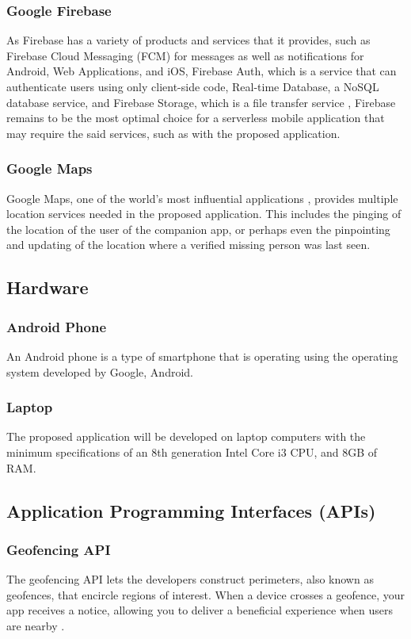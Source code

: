 \subsubsection{Google Firebase}
As Firebase has a variety of products and services that it provides, such as Firebase Cloud Messaging (FCM) for messages as well as notifications for Android, Web Applications, and iOS, Firebase Auth, which is a service that can authenticate users using only client-side code, Real-time Database, a NoSQL database service, and Firebase Storage, which is a file transfer service \cite{khawas2018application}, Firebase remains to be the most optimal choice for a serverless mobile application that may require the said services, such as with the proposed application.

\subsubsection{Google Maps}
Google Maps, one of the world’s most influential applications \cite{mehta2019google}, provides multiple location services needed in the proposed application. This includes the pinging of the location of the user of the companion app, or perhaps even the pinpointing and updating of the location where a verified missing person was last seen.

\subsection{Hardware}
\subsubsection{Android Phone}
An Android phone is a type of smartphone that is operating using the operating system developed by Google, Android.

\subsubsection{Laptop}
The proposed application will be developed on laptop computers with the minimum specifications of an 8th generation Intel Core i3 CPU, and 8GB of RAM.

\subsection{Application Programming Interfaces (APIs)}
\subsubsection{Geofencing API}
The geofencing API lets the developers construct perimeters, also known as geofences, that encircle regions of interest. When a device crosses a geofence, your app receives a notice, allowing you to deliver a beneficial experience when users are nearby \cite{geofencing}.

